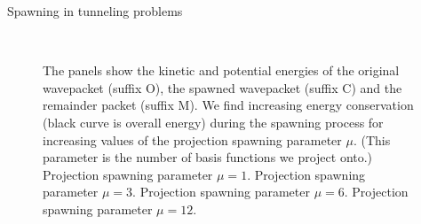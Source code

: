 \begin{chapter}{Spawning in tunneling problems}
\begin{figure}[h!]
{  } \\
  \caption[Energies of the original and spawned wavepackets using the projection spawning method]{
  The panels show the kinetic and potential energies of the original wavepacket (suffix O),
  the spawned wavepacket (suffix C) and the remainder packet (suffix M).
  We find increasing energy conservation (black curve is overall energy) during the spawning
  process for increasing values of the projection spawning parameter $\mu$.
  (This parameter is the number of basis functions we project onto.)
   Projection spawning parameter $\mu = 1$.
   Projection spawning parameter $\mu = 3$.
   Projection spawning parameter $\mu = 6$.
   Projection spawning parameter $\mu = 12$.
  \label{fig:tunnel_spawn_project_K50_spawn_energies}
  }
\end{figure}



\end{chapter}
